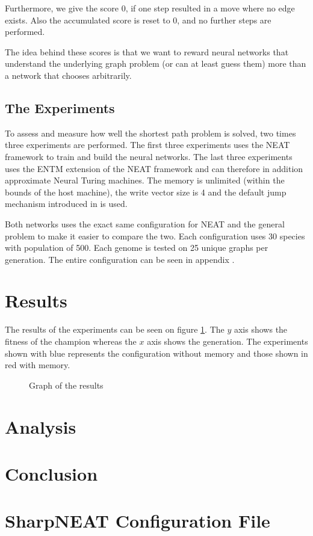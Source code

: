 \documentclass{article}
\newcommand{\newpar}{\bigskip\noindent}
\begin{document}
\noindent Furthermore, we give the score 0, if one step resulted in a move where no edge exists. Also the accumulated score is reset to 0, and no further steps are performed.

\newpar The idea behind these scores is that we want to reward neural networks that understand the underlying graph problem (or can at least guess them) more than a network that chooses arbitrarily.

\subsection{The Experiments}
To assess and measure how well the shortest path problem is solved, two times three experiments are performed. The first three experiments uses the NEAT framework to train and build the neural networks. The last three experiments uses the ENTM extension of the NEAT framework and can therefore in addition approximate Neural Turing machines. The memory is unlimited (within the bounds of the host machine), the write vector size is 4 and the default jump mechanism introduced in \cite{greve2016evolving} is used. 

\newpar Both networks uses the exact same configuration for NEAT and the general problem to make it easier to compare the two. Each configuration uses 30 species with population of 500. Each genome is tested on 25 unique graphs per generation. The entire configuration can be seen in appendix . 

\section{Results}
The results of the experiments can be seen on figure \ref{experiments:graph:1}. The $ y $ axis shows the fitness of the champion whereas the $ x $ axis shows the generation. The experiments shown with blue represents the configuration without memory and those shown in red with memory. 

\begin{figure}[ht]
	\caption{Graph of the results}
	\label{experiments:graph:1}
\end{figure}



\section{Analysis}



\section{Conclusion}

\newpage


\newpage

\appendix
\section{SharpNEAT Configuration File}
\end{document}
